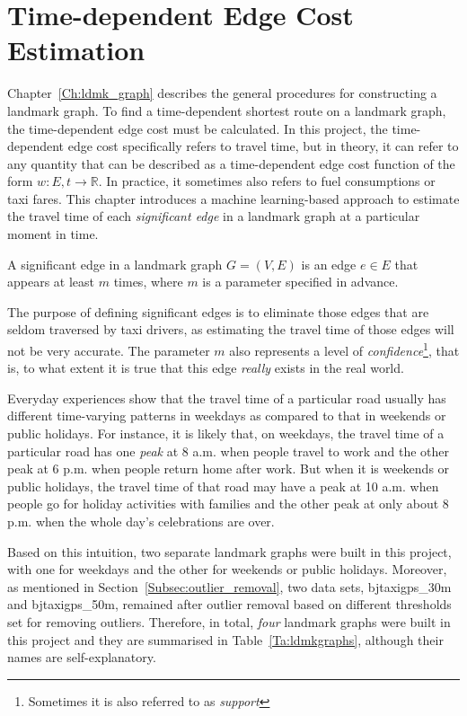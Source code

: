 \chapter{Time-dependent Edge Cost Estimation}
Chapter~\ref{Ch:ldmk_graph} describes the general procedures for constructing a landmark graph. To find a time-dependent shortest route on a landmark graph, the time-dependent edge cost must be calculated. In this project, the time-dependent edge cost specifically refers to travel time, but in theory, it can refer to any quantity that can be described as a time-dependent edge cost function of the form $w : E,t \rightarrow \mathbb{R}$. In practice, it sometimes also refers to fuel consumptions or taxi fares. This chapter introduces a machine learning-based approach to estimate the travel time of each \emph{significant edge} in a landmark graph at a particular moment in time. 

\begin{defn}
A significant edge in a landmark graph $G=(V,E)$ is an edge $e \in E$ that appears at least $m$ times, where $m$ is a parameter specified in advance.
\end{defn}

The purpose of defining significant edges is to eliminate those edges that are seldom traversed by taxi drivers, as estimating the travel time of those edges will not be very accurate. The parameter $m$ also represents a level of \emph{confidence}\footnote{Sometimes it is also referred to as \emph{support}}, that is, to what extent it is true that this edge \emph{really} exists in the real world. 

Everyday experiences show that the travel time of a particular road usually has different time-varying patterns in weekdays as compared to that in weekends or public holidays. For instance, it is likely that, on weekdays, the travel time of a particular road has one \emph{peak} at 8 a.m. when people travel to work and the other peak at 6 p.m. when people return home after work. But when it is weekends or public holidays, the travel time of that road may have a peak at 10 a.m. when people go for holiday activities with families and the other peak at only about 8 p.m. when the whole day's celebrations are over. 

Based on this intuition, two separate landmark graphs were built in this project, with one for weekdays and the other for weekends or public holidays. Moreover, as mentioned in Section~\ref{Subsec:outlier_removal}, 
two data sets, bjtaxigps\_30m and bjtaxigps\_50m, remained after outlier removal based on different thresholds set for removing outliers. Therefore, in total, \emph{four} landmark graphs were built in this project and they are summarised in Table~\ref{Ta:ldmkgraphs}, although their names are self-explanatory. 

